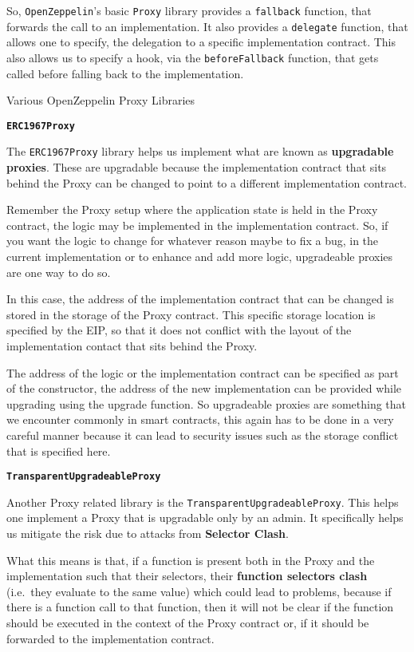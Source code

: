 So, \texttt{OpenZeppelin}'s basic \texttt{Proxy} library provides a
\texttt{fallback} function, that forwards the call to an implementation.
It also provides a \texttt{delegate} function, that allows one to
specify, the delegation to a specific implementation contract. This also
allows us to specify a hook, via the \texttt{beforeFallback} function,
that gets called before falling back to the implementation.

Various OpenZeppelin Proxy Libraries

\textbf{\texttt{ERC1967Proxy}}

The \texttt{ERC1967Proxy} library helps us implement what are known as
\textbf{upgradable proxies}. These are upgradable because the
implementation contract that sits behind the Proxy can be changed to
point to a different implementation contract.

Remember the Proxy setup where the application state is held in the
Proxy contract, the logic may be implemented in the implementation
contract. So, if you want the logic to change for whatever reason maybe
to fix a bug, in the current implementation or to enhance and add more
logic, upgradeable proxies are one way to do so.

In this case, the address of the implementation contract that can be
changed is stored in the storage of the Proxy contract. This specific
storage location is specified by the EIP, so that it does not conflict
with the layout of the implementation contact that sits behind the
Proxy.

The address of the logic or the implementation contract can be specified
as part of the constructor, the address of the new implementation can be
provided while upgrading using the upgrade function. So upgradeable
proxies are something that we encounter commonly in smart contracts,
this again has to be done in a very careful manner because it can lead
to security issues such as the storage conflict that is specified here.

\textbf{\texttt{TransparentUpgradeableProxy}}

Another Proxy related library is the
\texttt{TransparentUpgradeableProxy}. This helps one implement a Proxy
that is upgradable only by an admin. It specifically helps us mitigate
the risk due to attacks from \textbf{Selector Clash}.

What this means is that, if a function is present both in the Proxy and
the implementation such that their selectors, their \textbf{function
selectors clash} (i.e.~they evaluate to the same value) which could lead
to problems, because if there is a function call to that function, then
it will not be clear if the function should be executed in the context
of the Proxy contract or, if it should be forwarded to the
implementation contract.


